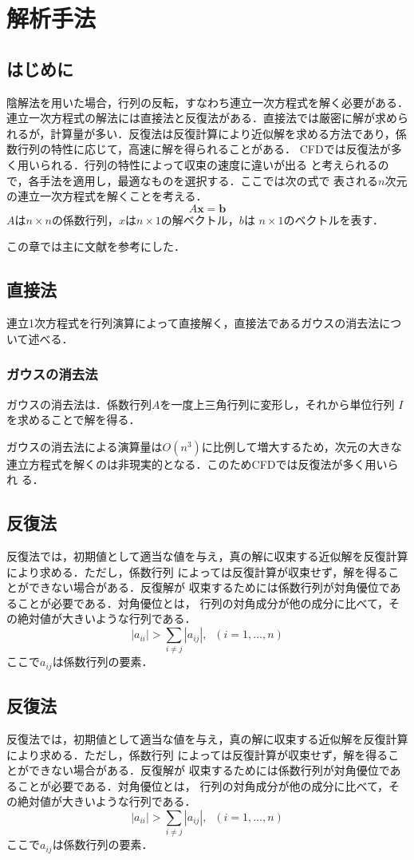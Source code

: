 \chapter{解析手法}
\label{chap:simulation}

\section{はじめに}
陰解法を用いた場合，行列の反転，すなわち連立一次方程式を解く必要がある．
連立一次方程式の解法には直接法と反復法がある．直接法では厳密に解が求めら
れるが，計算量が多い．反復法は反復計算により近似解を求める方法であり，係
数行列の特性に応じて，高速に解を得られることがある．
CFDでは反復法が多く用いられる．行列の特性によって収束の速度に違いが出る
と考えられるので，各手法を適用し，最適なものを選択する．ここでは次の式で
表される$n$次元の連立一次方程式を解くことを考える．
\begin{equation}
 A\bm{x}=\bm{b}
\label{eq:linear}
\end{equation}
$A$は$n\times n$の係数行列，$x$は$n\times1$の解ベクトル，$b$は
$n\times1$のベクトルを表す．

この章では主に文献\cite{test1}を参考にした．
\section{直接法}
連立1次方程式を行列演算によって直接解く，直接法であるガウスの消去法につ
いて述べる．
\subsection{ガウスの消去法}
ガウスの消去法は．係数行列$A$を一度上三角行列に変形し，それから単位行列
$I$を求めることで解を得る．

ガウスの消去法による演算量は$O(n^3)$に比例して増大するため，次元の大きな
連立方程式を解くのは非現実的となる．このためCFDでは反復法が多く用いられ
る．

\section{反復法}
反復法では，初期値として適当な値を与え，真の解に収束する近似解を反復計算により求める．ただし，係数行列
によっては反復計算が収束せず，解を得ることができない場合がある．反復解が
収束するためには係数行列が対角優位であることが必要である．対角優位とは，
行列の対角成分が他の成分に比べて，その絶対値が大きいような行列である．
\begin{equation}
 |a_{ii}|>\sum_{i\neq j}|a_{ij}|, \;\;(i=1,...,n)
\end{equation}
ここで$a_{ij}$は係数行列の要素．


\section{反復法}
反復法では，初期値として適当な値を与え，真の解に収束する近似解を反復計算により求める．ただし，係数行列
によっては反復計算が収束せず，解を得ることができない場合がある．反復解が
収束するためには係数行列が対角優位であることが必要である．対角優位とは，
行列の対角成分が他の成分に比べて，その絶対値が大きいような行列である．
\begin{equation}
 |a_{ii}|>\sum_{i\neq j}|a_{ij}|, \;\;(i=1,...,n)
\end{equation}
ここで$a_{ij}$は係数行列の要素．

